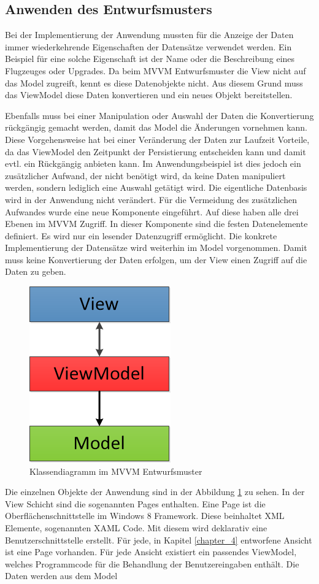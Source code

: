 \subsection{Anwenden des Entwurfsmusters}
Bei der Implementierung der Anwendung mussten für die Anzeige der Daten immer wiederkehrende Eigenschaften der Datensätze verwendet werden. Ein Beispiel für eine solche Eigenschaft ist der Name oder die Beschreibung eines Flugzeuges oder Upgrades. Da beim MVVM Entwurfsmuster die View nicht auf das Model zugreift, kennt es diese Datenobjekte nicht. Aus diesem Grund muss das ViewModel diese Daten konvertieren und ein neues Objekt bereitstellen. 

Ebenfalls muss bei einer Manipulation oder Auswahl der Daten die Konvertierung rückgängig gemacht werden, damit das Model die Änderungen vornehmen kann. Diese Vorgehensweise hat bei einer Veränderung der Daten zur Laufzeit Vorteile, da das ViewModel den Zeitpunkt der Persistierung entscheiden kann und damit evtl. ein Rückgängig anbieten kann. Im Anwendungsbeispiel ist dies jedoch ein zusätzlicher Aufwand, der nicht benötigt wird, da keine Daten manipuliert werden, sondern lediglich eine Auswahl getätigt wird. Die eigentliche Datenbasis wird in der Anwendung nicht verändert.
Für die Vermeidung des zusätzlichen Aufwandes wurde eine neue Komponente eingeführt. Auf diese haben alle drei Ebenen im MVVM Zugriff. In dieser Komponente sind die festen Datenelemente definiert. Es wird nur ein lesender Datenzugriff ermöglicht. Die konkrete Implementierung der Datensätze wird weiterhin im Model vorgenommen. Damit muss keine Konvertierung der Daten erfolgen, um der View einen Zugriff auf die Daten zu geben. \par 
\begin{figure}
\centering
\includegraphics{images/mvvm}
\caption{Klassendiagramm im MVVM Entwurfsmuster}
\label{mvvmApp}
\end{figure}
Die einzelnen Objekte der Anwendung sind in der Abbildung \ref{mvvmApp} zu sehen. In der View Schicht sind die sogenannten Pages enthalten. Eine Page ist die Oberflächenschnittstelle im Windows 8 Framework.  Diese beinhaltet XML Elemente, sogenannten XAML Code. Mit diesem wird deklarativ eine Benutzerschnittstelle erstellt. Für jede, in Kapitel \ref{chapter_4} entworfene Ansicht ist eine Page vorhanden. Für jede Ansicht existiert ein passendes ViewModel, welches Programmcode für die Behandlung der Benutzereingaben enthält. Die Daten werden aus dem Model


